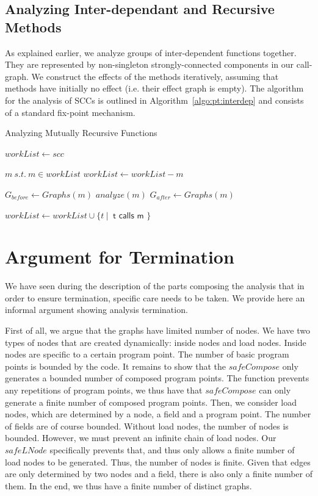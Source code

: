 \subsection{Analyzing Inter-dependant and Recursive Methods}
As explained earlier, we analyze groups of inter-dependent functions together.
They are represented by non-singleton strongly-connected components in our
call-graph.  We construct the effects of the methods iteratively, assuming that
methods have initially no effect (i.e. their effect graph is empty). The
algorithm for the analysis of SCCs is outlined in
Algorithm~\ref{algo:pt:interdep} and consists of a standard fix-point
mechanism.

\begin{algorithm}
\caption{Analyzing Mutually Recursive Functions}\label{algo:pt:interdep}
\begin{algorithmic}[1]
    \State $workList \gets scc$

        \State $m ~s.t.~ m \in workList$
        \State $workList \gets workList - m$

        \State $G_{before} \gets Graphs(m)$
        \State $analyze(m)$
        \State $G_{after} \gets Graphs(m)$

            \State $workList \gets workList \cup \{ t ~|~ \textsf{ t calls m } \}$
        \EndIf
    \EndWhile

\EndFunction
\end{algorithmic}
\end{algorithm}

\section{Argument for Termination}
We have seen during the description of the parts composing the analysis that in
order to ensure termination, specific care needs to be taken. We provide
here an informal argument showing analysis termination.

First of all, we argue that the graphs have limited number of nodes. We have two
types of nodes that are created dynamically: inside nodes and load nodes.
Inside nodes are specific to a certain program point. The number of basic
program points is bounded by the code. It remains to show that the
$safeCompose$ only generates a bounded number of composed program points. The
function prevents any repetitions of program points, we thus have
that $safeCompose$ can only generate a finite number of composed program
points. Then, we consider load nodes, which are determined by a node, a field and a
program point. The number of fields are of course bounded. Without
load nodes, the number of nodes is bounded. However, we must prevent an
infinite chain of load nodes. Our $safeLNode$ specifically prevents that, and
thus only allows a finite number of load nodes to be generated. Thus, the
number of nodes is finite. Given that edges are only determined by two nodes
and a field, there is also only a finite number of them. In the end, we thus
have a finite number of distinct graphs.

